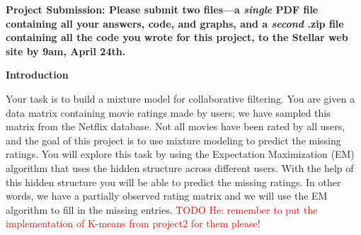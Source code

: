 

\usepackage[pdftex]{graphicx}
\usepackage{amsmath, amsthm, amssymb, amsfonts, mathtools, graphicx, enumerate}
\usepackage{times}
\usepackage{booktabs}
\usepackage{url}
\usepackage{enumerate}
\usepackage{enumitem}

\usepackage{xcolor}

\setlength{\parindent}{0pt}
\setlength{\parskip}{1ex}

\newcommand{\answer}[1]{{\mbox{}\color{red}{#1}}}
\newcommand{\emptycheck}{\text{(\hspace{-.75ex}(\hspace{3ex})\hspace{-.75ex})}}
\newcommand{\checkans}[1]{\text{(\hspace{-.75ex}(\hspace{1ex}{#1}\hspace{1ex})\hspace{-.75ex})}}
\newcommand{\argmax}{{\mbox{arg}\hspace{-.1ex}}\max}

\newcommand{\note}[1]{\textcolor{red}{#1}}




{\bf Project Submission: Please submit two files---a \emph{single} PDF file containing all your answers, code, and graphs, and a
\emph{second} .zip file containing all the code you wrote for this
project, to
the Stellar web site by 9am, April 24th.}

\textbf{Introduction}

Your task is to build a mixture model for collaborative filtering. You are given a data matrix containing movie ratings made by users; we have sampled this matrix from the Netflix database. Not all movies have been rated by all users, and the goal of this project is to use mixture modeling to predict the missing ratings. You will explore this task by using the Expectation Maximization (EM) algorithm that uses the hidden structure across different users. With the help of this hidden structure you will be able to predict the missing ratings. In other words, we have a partially observed rating matrix and we will use the EM algorithm to fill in the missing entries.
\note{TODO He: remember to put the implementation of K-means from project2 for them please!}

